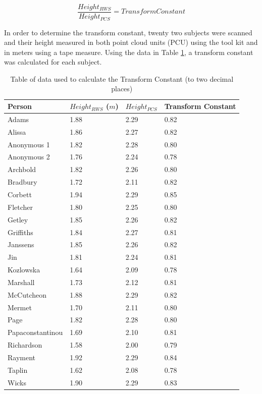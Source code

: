\begin{equation}
\frac{Height_{RWS}}{Height_{PCS}} = Transform Constant
\label{testing: calculating the transform constant using height}
\end{equation}

In order to determine the transform constant, twenty two subjects were scanned and their height measured in both point cloud units (PCU) using the tool kit and in meters using a tape measure. Using the data in Table \ref{testing: table of data used to calculate the transform constant}, a transform constant was calculated for each subject.\\

\begin{table}[!htb]
\begin{center}
  \begin{tabular}{| l | p{3cm} | p{2cm} | p{2cm} |}
    \hline
    Person & $Height_{RWS}$ ($m$) & $Height_{PCS}$ & Transform Constant \\ \hline
    Adams & 1.88 & 2.29 & 0.82\\ \hline
    Alissa & 1.86 & 2.27 & 0.82 \\ \hline
    Anonymous 1 & 1.82 & 2.28 & 0.80\\ \hline
    Anonymous 2 & 1.76 & 2.24 & 0.78\\ \hline
    Archbold & 1.82 & 2.26 & 0.80\\ \hline
    Bradbury & 1.72 & 2.11 & 0.82\\ \hline
    Corbett & 1.94 & 2.29 & 0.85\\ \hline
    Fletcher & 1.80 & 2.25 & 0.80\\ \hline
    Getley & 1.85 & 2.26 & 0.82\\ \hline
    Griffiths & 1.84 & 2.27 & 0.81\\ \hline
    Janssens & 1.85 & 2.26 & 0.82\\ \hline
    Jin	& 1.81 & 2.24 & 0.81\\ \hline
    Kozlowska & 1.64 & 2.09 & 0.78\\ \hline
    Marshall & 1.73 & 2.12 & 0.81\\ \hline
    McCutcheon & 1.88 & 2.29 & 0.82\\ \hline
    Mermet & 1.70 & 2.11 & 0.80\\ \hline
    Page & 1.82 & 2.28 & 0.80\\ \hline
    Papaconstantinou & 1.69 & 2.10 & 0.81\\ \hline
    Richardson & 1.58 & 2.00 & 0.79\\ \hline
    Rayment & 1.92 & 2.29 & 0.84\\ \hline
    Taplin & 1.62 & 2.08 & 0.78\\ \hline
    Wicks &1.90 & 2.29 & 0.83\\ \hline
  \end{tabular}
\end{center}
\caption{Table of data used to calculate the Transform Constant (to two decimal places)}
\label{testing: table of data used to calculate the transform constant}
\end{table}

